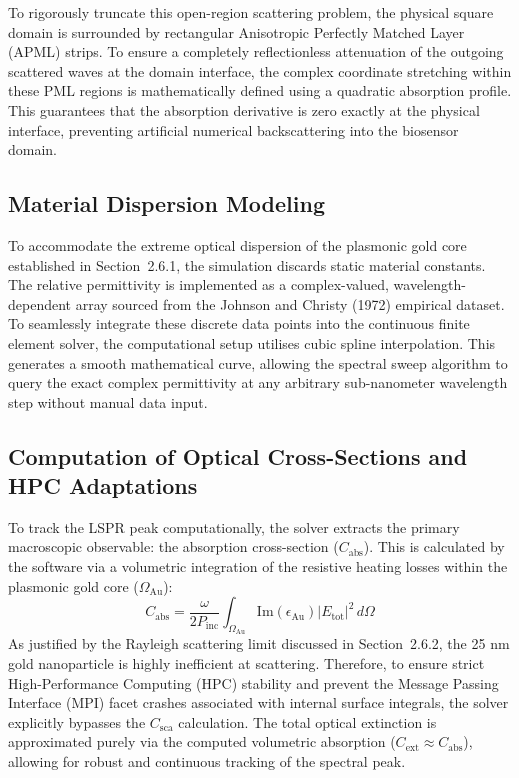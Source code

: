 \vspace{12pt}

To rigorously truncate this open-region scattering problem, the physical square domain is surrounded by rectangular Anisotropic Perfectly Matched Layer (APML) strips. To ensure a completely reflectionless attenuation of the outgoing scattered waves at the domain interface, the complex coordinate stretching within these PML regions is mathematically defined using a quadratic absorption profile. This guarantees that the absorption derivative is zero exactly at the physical interface, preventing artificial numerical backscattering into the biosensor domain.

\subsection{Material Dispersion Modeling}

To accommodate the extreme optical dispersion of the plasmonic gold core established in Section~2.6.1, the simulation discards static material constants. The relative permittivity is implemented as a complex-valued, wavelength-dependent array sourced from the Johnson and Christy (1972) empirical dataset. To seamlessly integrate these discrete data points into the continuous finite element solver, the computational setup utilises cubic spline interpolation. This generates a smooth mathematical curve, allowing the spectral sweep algorithm to query the exact complex permittivity at any arbitrary sub-nanometer wavelength step without manual data input.

\subsection{Computation of Optical Cross-Sections and HPC Adaptations}

To track the LSPR peak computationally, the solver extracts the primary macroscopic observable: the absorption cross-section ($C_{\text{abs}}$). This is calculated by the software via a volumetric integration of the resistive heating losses within the plasmonic gold core ($\Omega_{\text{Au}}$):
\begin{equation}
C_{\text{abs}} = \frac{\omega}{2 P_{\text{inc}}} \int_{\Omega_{\text{Au}}} \text{Im}(\epsilon_{\text{Au}}) |E_{\text{tot}}|^2 \, d\Omega
\label{eq:cabs}
\end{equation}
As justified by the Rayleigh scattering limit discussed in Section~2.6.2, the 25 nm gold nanoparticle is highly inefficient at scattering. Therefore, to ensure strict High-Performance Computing (HPC) stability and prevent the Message Passing Interface (MPI) facet crashes associated with internal surface integrals, the solver explicitly bypasses the $C_{\text{sca}}$ calculation. The total optical extinction is approximated purely via the computed volumetric absorption ($C_{\text{ext}} \approx C_{\text{abs}}$), allowing for robust and continuous tracking of the spectral peak.

